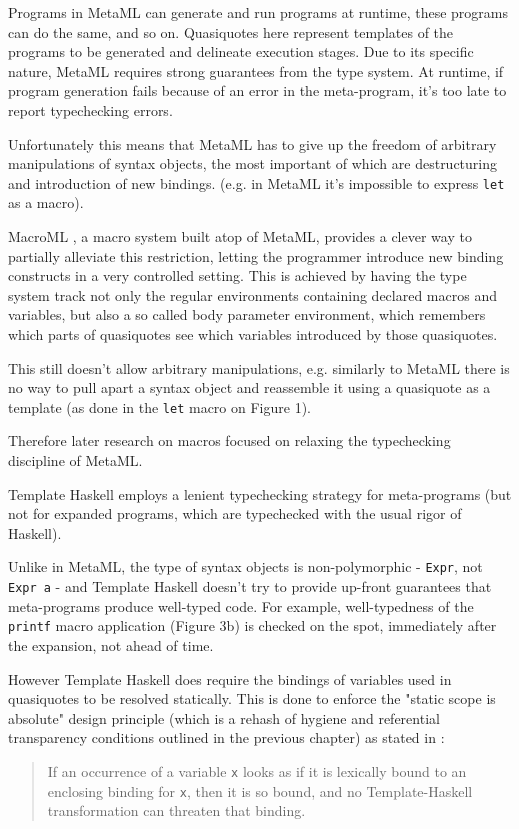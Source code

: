 \documentclass[10pt,journal,a4paper]{IEEEtran}
\begin{document}
Programs in MetaML can generate and run programs at runtime, these programs can do the same, and so on.
Quasiquotes here represent templates of the programs to be generated and delineate execution stages.
Due to its specific nature, MetaML requires strong guarantees from the type system.
At runtime, if program generation fails because of an error in the meta-program,
it's too late to report typechecking errors.

Unfortunately this means that MetaML has to give up the freedom of arbitrary manipulations
of syntax objects, the most important of which are destructuring and introduction of new bindings.
(e.g. in MetaML it’s impossible to express \texttt{let} as a macro).

MacroML \cite{ganz01}, a macro system built atop of MetaML,
provides a clever way to partially alleviate this restriction, letting
the programmer introduce new binding constructs in a very controlled setting.
This is achieved by having the type system track
not only the regular environments containing declared macros and variables, but also
a so called body parameter environment, which remembers which parts of quasiquotes
see which variables introduced by those quasiquotes.

This still doesn't allow arbitrary manipulations, e.g. similarly to MetaML there is no way
to pull apart a syntax object and reassemble it using a quasiquote as a template (as done in the \texttt{let}
macro on Figure 1).

Therefore later research on macros focused on relaxing the typechecking discipline of MetaML.

Template Haskell \cite{sheard02} employs a lenient typechecking strategy for meta-programs
(but not for expanded programs, which are typechecked with the usual rigor of Haskell).

Unlike in MetaML, the type of syntax objects is non-polymorphic - \texttt{Expr}, not \texttt{Expr a} -
and Template Haskell doesn't try to provide up-front guarantees that meta-programs produce well-typed code.
For example, well-typedness of the \texttt{printf} macro application (Figure 3b) is checked on the spot,
immediately after the expansion, not ahead of time.

However Template Haskell does require the bindings of variables used in quasiquotes to be resolved statically.
This is done to enforce the "static scope is absolute" design principle
(which is a rehash of hygiene and referential transparency conditions outlined in the previous chapter)
as stated in \cite{sheard03}:
\begin{quote}
If an occurrence of a variable \texttt{x} looks as if it is lexically bound
to an enclosing binding for \texttt{x},
then it is so bound, and no Template-Haskell transformation can threaten that binding.
\end{quote}
\end{document}
